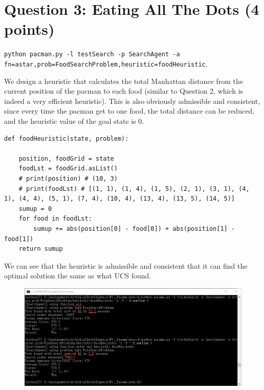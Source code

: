 \documentclass[a4paper, 11pt]{article}
\begin{document}
\section{Question 3: Eating All The Dots (4 points)}
\texttt{python pacman.py -l testSearch -p SearchAgent -a fn=astar,prob=FoodSearchProblem,heuristic=foodHeuristic}.

We design a heuristic that calculates the total Manhattan distance from the current position of the pacman to each food (similar to Question 2, which is indeed a very efficient heuristic).
This is also obviously admissible and consistent, since every time the pacman get to one food, the total distance can be reduced, and the heuristic value of the goal state is 0.

\begin{lstlisting}
def foodHeuristic(state, problem):

    position, foodGrid = state
    foodLst = foodGrid.asList()
    # print(position) # (10, 3)
    # print(foodLst) # [(1, 1), (1, 4), (1, 5), (2, 1), (3, 1), (4, 1), (4, 4), (5, 1), (7, 4), (10, 4), (13, 4), (13, 5), (14, 5)]
    sumup = 0
    for food in foodLst:
        sumup += abs(position[0] - food[0]) + abs(position[1] - food[1])
    return sumup
\end{lstlisting}

We can see that the heuristic is admissible and consistent that it can find the optimal solution the same as what UCS found.
\begin{figure}[H]
  \centering
  \includegraphics[width=\linewidth]{fig/Q3.png}
\end{figure}
\end{document}
